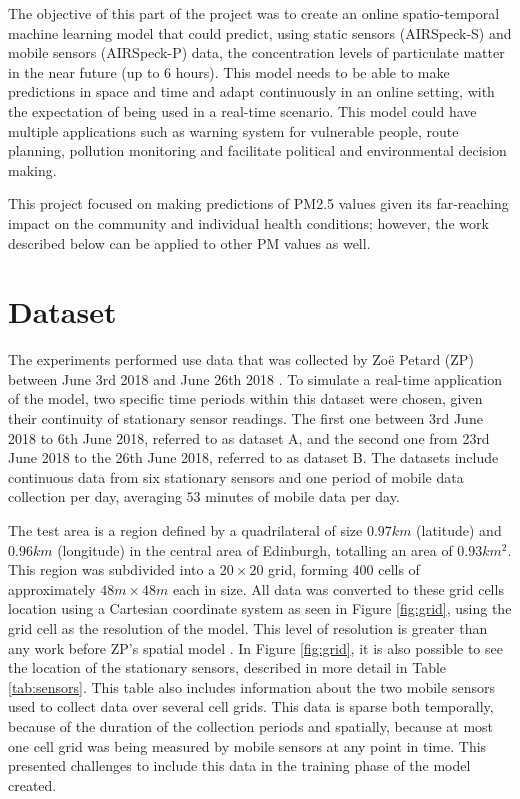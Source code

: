 The objective of this part of the project was to create an online spatio-temporal machine learning model that could predict, using static sensors (AIRSpeck-S) and mobile sensors (AIRSpeck-P) data, the concentration levels of particulate matter in the near future (up to 6 hours). This model needs to be able to make predictions in space and time and adapt continuously in an online setting, with the expectation of being used in a real-time scenario. This model could have multiple applications such as warning system for vulnerable people, route planning, pollution monitoring and facilitate political and environmental decision making.

This project focused on making predictions of PM2.5 values given its far-reaching impact on the community and individual health conditions; however, the work described below can be applied to other PM values as well.


\section{Dataset}

The experiments performed use data that was collected by Zo\"e Petard (ZP) between June 3rd 2018 and June 26th 2018 \cite{zoe}. To simulate a real-time application of the model, two specific time periods within this dataset were chosen, given their continuity of stationary sensor readings. The first one between 3rd June 2018 to 6th June 2018, referred to as dataset A, and the second one from 23rd June 2018 to the 26th June 2018, referred to as dataset B. The datasets include continuous data from six stationary sensors and one period of mobile data collection per day, averaging $53$ minutes of mobile data per day. 

The test area is a region defined by a quadrilateral of size $0.97km$ (latitude) and $0.96km$ (longitude) in the central area of Edinburgh, totalling an area of $0.93 km^2$. This region was subdivided into a $20 \times 20$ grid, forming 400 cells of approximately $48m \times 48m$ each in size. All data was converted to these grid cells location using a Cartesian coordinate system as seen in Figure \ref{fig:grid}, using the grid cell as the resolution of the model. This level of resolution is greater than any work before ZP's spatial model \cite{zoe}.
In Figure \ref{fig:grid}, it is also possible to see the location of the stationary sensors, described in more detail in Table \ref{tab:sensors}. This table also includes information about the two mobile sensors used to collect data over several cell grids. This data is sparse both temporally, because of the duration of the collection periods and spatially, because at most one cell grid was being measured by mobile sensors at any point in time. This presented challenges to include this data in the training phase of the model created.


